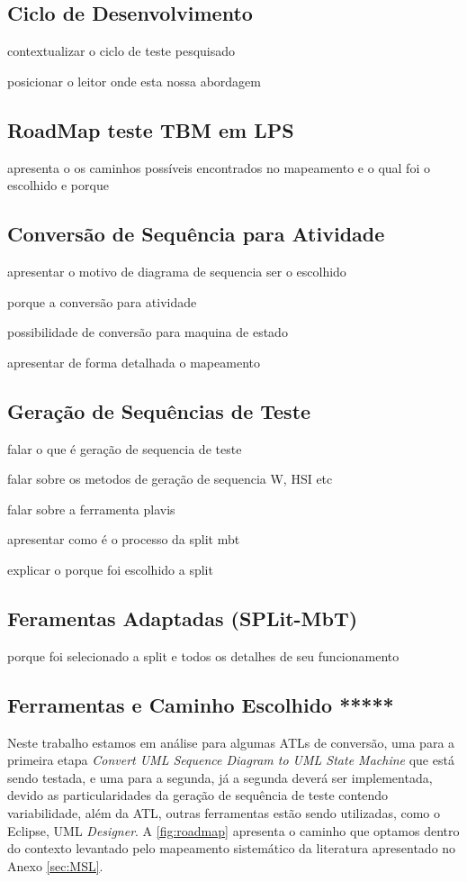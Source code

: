 \subsection{Ciclo de Desenvolvimento}

contextualizar o ciclo de teste pesquisado

posicionar o leitor onde esta nossa abordagem

\subsection{RoadMap teste TBM em LPS}

apresenta o os caminhos possíveis encontrados no mapeamento e o qual foi o escolhido e porque



\subsection{Conversão de Sequência para Atividade}
apresentar o motivo de diagrama de sequencia ser o escolhido

porque a conversão para atividade

possibilidade de conversão para maquina de estado

apresentar de forma detalhada o mapeamento



\subsection{Geração de Sequências de Teste}

falar o que é geração de sequencia de teste

falar sobre os metodos de geração de sequencia W, HSI etc

falar sobre a ferramenta plavis

apresentar como é o processo da split mbt

explicar o porque foi escolhido a split



\subsection{Feramentas Adaptadas (SPLit-MbT)}

porque foi selecionado a split e todos os detalhes de seu funcionamento


\subsection{Ferramentas e Caminho Escolhido *****}
Neste trabalho estamos em análise para algumas ATLs de conversão, uma para a primeira etapa \textit{Convert UML Sequence Diagram to UML State Machine } que está sendo testada, e uma para a segunda,  já a segunda deverá ser implementada, devido as particularidades da geração de sequência de teste contendo variabilidade, além da ATL, outras ferramentas estão sendo utilizadas, como o Eclipse, UML \textit{Designer}. A \ref{fig:roadmap} apresenta o caminho que optamos dentro do contexto levantado pelo mapeamento sistemático da literatura apresentado no Anexo \ref{sec:MSL}.


